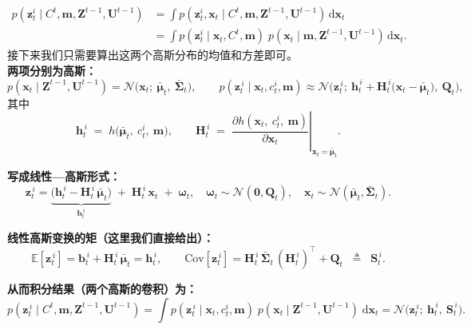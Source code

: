 \documentclass[../main.tex]{subfiles}
\begin{document}
\begin{enumerate}
\begin{itemize}
{{        \begin{align}
        p(\mathbf{z}_t^i \mid C^t,\mathbf{m},\mathbf{Z}^{t-1},\mathbf{U}^{t-1})
        &= \int p(\mathbf{z}_t^i,\mathbf{x}_t \mid C^t,\mathbf{m},\mathbf{Z}^{t-1},\mathbf{U}^{t-1})\,\mathrm{d}\mathbf{x}_t \\
        &= \int p(\mathbf{z}_t^i \mid \mathbf{x}_t,C^t,\mathbf{m})\; p(\mathbf{x}_t \mid \mathbf{m},\mathbf{Z}^{t-1},\mathbf{U}^{t-1})\,\mathrm{d}\mathbf{x}_t .
        \end{align}
        接下来我们只需要算出这两个高斯分布的均值和方差即可。\\
        \noindent\textbf{两项分别为高斯：}
\[
p(\mathbf{x}_t \mid \mathbf{Z}^{t-1},\mathbf{U}^{t-1})
=\mathcal{N}\!\big(\mathbf{x}_t;\ \bar{\boldsymbol{\mu}}_t,\ \bar{\boldsymbol{\Sigma}}_t\big),
\qquad
p(\mathbf{z}_t^{\,i}\mid \mathbf{x}_t,c_t^i,\mathbf{m})
\approx \mathcal{N}\!\Big(\mathbf{z}_t^{\,i};\ \mathbf{h}_t^{\,i} + \mathbf{H}_t^{\,i}\!\big(\mathbf{x}_t-\bar{\boldsymbol{\mu}}_t\big),\ \mathbf{Q}_t\Big),
\]
其中
\[
\mathbf{h}_t^{\,i} \;=\; h\!\big(\bar{\boldsymbol{\mu}}_t,\ c_t^i,\ \mathbf{m}\big), 
\qquad 
\mathbf{H}_t^{\,i} \;=\; \left.\dfrac{\partial h(\mathbf{x}_t,\ c_t^i,\ \mathbf{m})}{\partial \mathbf{x}_t}\right|_{\mathbf{x}_t=\bar{\boldsymbol{\mu}}_t}.
\]

\noindent\textbf{写成线性—高斯形式：}
\[
\mathbf{z}_t^{\,i}
= \underbrace{\big(\mathbf{h}_t^{\,i} - \mathbf{H}_t^{\,i}\,\bar{\boldsymbol{\mu}}_t\big)}_{\displaystyle \mathbf{b}_t^{\,i}}
\;+\; \mathbf{H}_t^{\,i}\,\mathbf{x}_t \;+\; \boldsymbol{\omega}_t,
\quad \boldsymbol{\omega}_t \sim \mathcal{N}(\mathbf{0},\mathbf{Q}_t),\quad
\mathbf{x}_t \sim \mathcal{N}(\bar{\boldsymbol{\mu}}_t,\bar{\boldsymbol{\Sigma}}_t).
\]

\noindent\textbf{线性高斯变换的矩（这里我们直接给出）：}
\[
\mathbb{E}[\mathbf{z}_t^{\,i}]
= \mathbf{b}_t^{\,i} + \mathbf{H}_t^{\,i}\,\bar{\boldsymbol{\mu}}_t
= \mathbf{h}_t^{\,i},
\qquad
\mathrm{Cov}[\mathbf{z}_t^{\,i}]
= \mathbf{H}_t^{\,i}\,\bar{\boldsymbol{\Sigma}}_t\,(\mathbf{H}_t^{\,i})^\top + \mathbf{Q}_t
\;\; \triangleq\;\; \mathbf{S}_t^{\,i}.
\]

\noindent\textbf{从而积分结果（两个高斯的卷积）为：}
\[
p(\mathbf{z}_t^{\,i} \mid C^t,\mathbf{m},\mathbf{Z}^{t-1},\mathbf{U}^{t-1})
= \int p(\mathbf{z}_t^{\,i}\mid \mathbf{x}_t,c_t^i,\mathbf{m})\;
        p(\mathbf{x}_t\mid \mathbf{Z}^{t-1},\mathbf{U}^{t-1})\; \mathrm{d}\mathbf{x}_t
= \mathcal{N}\!\big(\mathbf{z}_t^{\,i};\ \mathbf{h}_t^{\,i},\ \mathbf{S}_t^{\,i}\big).
\]

}}
\end{itemize}
\end{enumerate}
\end{document}
